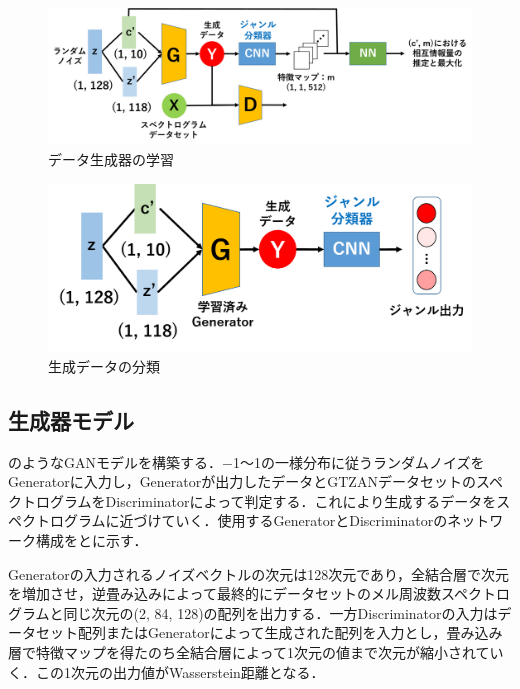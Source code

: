 \vspace{30pt}
\begin{figure}[htbp]
	\begin{center}
		\includegraphics[scale=0.5]{./images/generate-model/abst.png}
		\caption{データ生成器の学習}
		\label{fig:proposed-abst}
	\end{center}
\end{figure}
\begin{figure}[htbp]
	\begin{center}
		\includegraphics[scale=0.5]{./images/generate-model/abst2.png}
		\caption{生成データの分類}
		\label{fig:proposed-abst2}
	\end{center}
\end{figure}


\clearpage
\subsection{生成器モデル}
のようなGANモデルを構築する．$-$1～1の一様分布に従うランダムノイズをGeneratorに入力し，Generatorが出力したデータとGTZANデータセットのスペクトログラムをDiscriminatorによって判定する．これにより生成するデータをスペクトログラムに近づけていく．使用するGeneratorとDiscriminatorのネットワーク構成をとに示す．


Generatorの入力されるノイズベクトルの次元は128次元であり，全結合層で次元を増加させ，逆畳み込みによって最終的にデータセットのメル周波数スペクトログラムと同じ次元の(2, 84, 128)の配列を出力する．一方Discriminatorの入力はデータセット配列またはGeneratorによって生成された配列を入力とし，畳み込み層で特徴マップを得たのち全結合層によって1次元の値まで次元が縮小されていく．この1次元の出力値がWasserstein距離となる．

